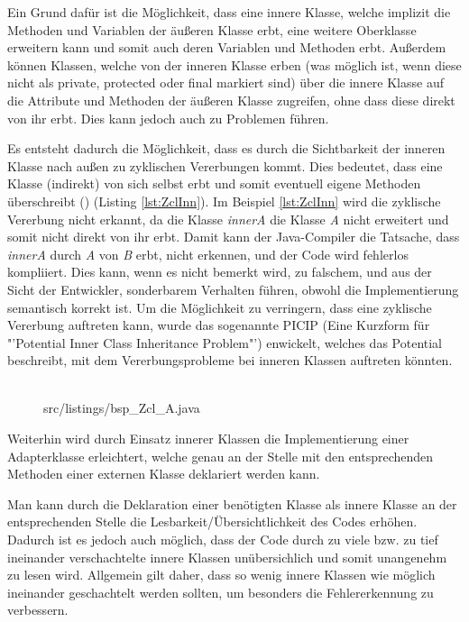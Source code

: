 Ein Grund dafür ist die Möglichkeit, dass eine innere Klasse, welche implizit die Methoden und Variablen der äußeren Klasse erbt, eine weitere Oberklasse erweitern kann und somit auch deren Variablen und Methoden erbt.
Außerdem können Klassen, welche von der inneren Klasse erben (was möglich ist, wenn diese nicht als private, protected oder final markiert sind) über die innere Klasse auf die Attribute und Methoden der äußeren Klasse zugreifen, ohne dass diese direkt von ihr erbt. Dies kann jedoch auch zu Problemen führen.

Es entsteht dadurch die Möglichkeit, dass es durch die Sichtbarkeit der inneren Klasse nach außen zu zyklischen Vererbungen kommt. Dies bedeutet, dass eine Klasse (indirekt) von sich selbst erbt und somit eventuell eigene Methoden überschreibt (\cite{DBLP:journals/corr/abs-1301-6260}) (Listing \ref{lst:ZclInn}).
Im Beispiel \ref{lst:ZclInn}  wird die zyklische Vererbung nicht erkannt, da die Klasse {\it innerA} die Klasse {\it A} nicht erweitert und somit nicht direkt von ihr erbt. Damit kann der Java-Compiler die Tatsache, dass {\it innerA} durch {\it A} von {\it B} erbt, nicht erkennen, und der Code wird fehlerlos kompliiert.
Dies kann, wenn es nicht bemerkt wird, zu falschem, und aus der Sicht der Entwickler, sonderbarem Verhalten führen, obwohl die Implementierung semantisch korrekt ist.
Um die Möglichkeit zu verringern, dass eine zyklische Vererbung auftreten kann, wurde das sogenannte PICIP (Eine Kurzform für "'Potential Inner Class Inheritance Problem"') enwickelt, welches das Potential beschreibt, mit dem Vererbungsprobleme bei inneren Klassen auftreten könnten.
\\
\\
\begin{figure}[hbt]
\lstset{language=Java}
 {src/listings/bsp_Zcl_A.java}
\end{figure}

Weiterhin wird durch Einsatz innerer Klassen die Implementierung einer Adapterklasse erleichtert, welche genau an der Stelle mit den entsprechenden Methoden einer externen Klasse deklariert werden kann.

Man kann durch die Deklaration einer benötigten Klasse als innere Klasse an der entsprechenden Stelle die Lesbarkeit/Übersichtlichkeit des Codes erhöhen.
Dadurch ist es jedoch auch möglich, dass der Code durch zu viele bzw. zu tief ineinander verschachtelte innere Klassen unübersichlich und somit unangenehm zu lesen wird.
Allgemein gilt daher, dass so wenig innere Klassen wie möglich ineinander geschachtelt werden sollten, um besonders die Fehlererkennung zu verbessern.

